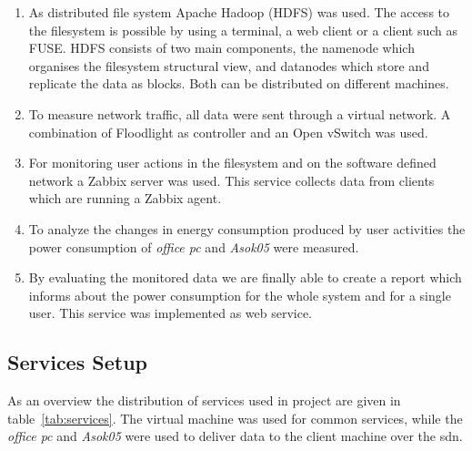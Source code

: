 \begin{enumerate}

\item As distributed file system Apache Hadoop (HDFS) was used. The access to the filesystem is possible by using a terminal, a web client or a client such as FUSE. HDFS consists of two main components, the namenode which organises the filesystem structural view, and datanodes which store and replicate the data as blocks. Both can be distributed on different machines.

\item To measure network traffic, all data were sent through a virtual network. A combination of Floodlight as controller and an Open vSwitch was used. 

\item For monitoring user actions in the filesystem and on the software defined network a Zabbix server was used. This service collects data from clients which are running a Zabbix agent.

\item To analyze the changes in energy consumption produced by user activities the power consumption of \textit{office pc} and \textit{Asok05} were measured.

\item By evaluating the monitored data we are finally able to create a  report which informs about the power consumption for the whole system and for a single user. This service was implemented as web service.

\end{enumerate}

\subsection{Services Setup}

As an overview the distribution of services used in project are given in table~\ref{tab:services}. The virtual machine was used for common services, while the \textit{office pc} and \textit{Asok05} were used to deliver data to the client machine over the sdn.

